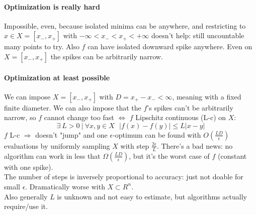 \documentclass[10pt]{report}
\begin{document}
\paragraph{Optimization is really hard} Impossible, even, because isolated minima can be anywhere, and restricting to $x\in X=[x_-, x_+]$ with $-\infty<x_-<x_+<+\infty$ doesn't help: still uncountable many points to try. Also $f$ can have isolated downward spike anywhere. Even on $X = [x_-, x_+]$ the spikes can be arbitrarily narrow.
\paragraph{Optimization at least possible} We can impose $X=[x_-,x_+]$ with $D = x_+-x_-<\infty$, meaning with a fixed finite diameter. We can also impose that the $f$'s spikes can't be arbitrarily narrow, so $f$ cannot change too fast $\Leftrightarrow$ $f$ Lipschitz continuous (L-c) on $X$: $$\exists\: L > 0\:|\:\forall x,y\in X\:\:\:|f(x) - f(y)| \leq L|x - y|$$
$f$ L-c $\Rightarrow$ doesn't "jump" and one $\epsilon$-optimum can be found with $O(\frac{LD}{\epsilon})$ evaluations by uniformly sampling $X$ with step $\frac{2\epsilon}{L}$. There's a bad news: no algorithm can work in less that $\Omega(\frac{LD}{\epsilon})$, but it's the worst case of $f$ (constant with one spike).\\
The number of steps is inversely proportional to accuracy: just not doable for small $\epsilon$. Dramatically worse with $X\subset R^n$.\\
Also generally $L$ is unknown and not easy to estimate, but algorithms actually require/use it.
\end{document}
